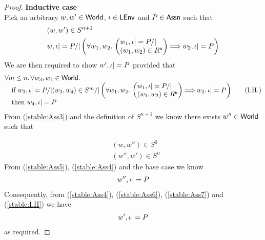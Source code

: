 \begin{lemma}[Stability]
\begin{proof}
\noindent\textbf{Inductive case}\\
Pick an arbitrary $w, w' \in \textsf{World}$, $\iota \in \textsf{LEnv}$ and $P \in \textsf{Assn}$ such that
%
\begin{align}
	& (w, w') \in S^{n+1} \label{stable:Ass3}\\
	& w, \lenv |= P /| 
		\left(
		\begin{array}{@{} l @{}}
			\for{w_1, w_2} 
			\left(
			\begin{array}{@{} l @{}}
				w_1, \lenv |= P /|\\
			 (w_1, w_2) \in \updateR  
			\end{array}
			\right)
			\!\!\implies \!\!
			w_2, \lenv |= P 
		\end{array}
		\right) \label{stable:Ass4}
\end{align}
%
We are then required to show $w', \iota |= P$ provided that
%
\begin{align}
	\begin{array}{@{} l @{}}
		\for{m \leq n} \for{w_3, w_4 \in \Worlds} \\
		\quad \text{if } w_3, \lenv |= P /| (w_3, w_4) \in S^{m} /| 
		\left(
		\begin{array}{@{} l @{}}
			\for{w_1, w_2} 
			\left(
			\begin{array}{@{} l @{}}
				w_1, \lenv |= P /|\\
			 (w_1, w_2) \in \updateR  
			\end{array}
			\right)
			\!\!\implies \!\!
			w_2, \lenv |= P 
		\end{array}
		\right)\\
		\quad \text{then } w_4, \lenv |= P
	\end{array}\tag{I.H.} \label{stable:I.H}
\end{align}
%
From (\ref{stable:Ass3}) and the definition of $S^{n+1}$ we know there exists $w'' \in \textsf{World}$ such that 

\begin{align}
	& (w, w'') \in S^{0} \label{stable:Ass5} \\
	& (w'', w') \in S^{n} \label{stable:Ass6}
\end{align}
%
From (\ref{stable:Ass5}), (\ref{stable:Ass4}) and the base case we know 
%
\begin{align}
	w'', \iota |= P \label{stable:Ass7}
\end{align}
%
Consequently, from (\ref{stable:Ass4}), (\ref{stable:Ass6}), (\ref{stable:Ass7}) and (\ref{stable:I.H}) we have
%
\begin{align*}
	w', \iota |= P
\end{align*}
as required.
%
%
\end{proof}
%	 
\end{lemma}
